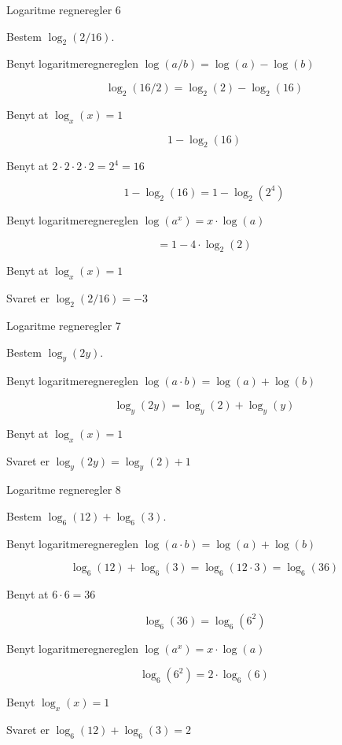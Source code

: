 \documentclass{article}
\begin{document}
\newpage
\begin{exercise}{Logaritme regneregler 6}

Bestem $\log_{2}(2/16) $.


\hint

Benyt logaritmeregnereglen $\log(a / b) = \log(a) - \log(b)$

\hint
\[
\log_{2}(16/2) = \log_{2}(2) - \log_{2}(16)
\]

\hint
Benyt at $\log_{x}(x) = 1$

\hint
\[
1 - \log_{2}(16)
\]

\hint
Benyt at $2 \cdot 2 \cdot 2 \cdot 2 = 2^4 = 16$

\hint
\[
1 - \log_{2}(16) = 1 - \log_{2}(2^4)
\]

\hint
Benyt logaritmeregnereglen $\log(a^x) = x \cdot \log(a)$

\hint
\[
= 1 - 4 \cdot \log_{2}(2)
\]

\hint
Benyt at $\log_{x}(x) = 1$

\hint

Svaret er $\log_{2}(2/16) = -3 $
\end{exercise}

\newpage
\begin{exercise}{Logaritme regneregler 7}

Bestem $\log_{y}(2y) $.


\hint

Benyt logaritmeregnereglen $\log(a \cdot b) = \log(a) + \log(b)$

\hint
\[
\log_{y}(2y) = \log_{y}(2) + \log_{y}(y)
\]

\hint
Benyt at $\log_{x}(x) = 1$

\hint

Svaret er $\log_{y}(2y) = \log_{y}(2) + 1 $
\end{exercise}

\newpage
\begin{exercise}{Logaritme regneregler 8}

Bestem $\log_{6}(12) + \log_{6}(3)$.


\hint

Benyt logaritmeregnereglen $\log(a \cdot b) = \log(a) + \log(b)$

\hint
\[
\log_{6}(12) + \log_{6}(3) = \log_{6}(12 \cdot 3) = \log_{6}(36)
\]

\hint
Benyt at $6 \cdot 6 = 36$

\hint
\[
\log_{6}(36) = \log_{6}(6^2)
\]

\hint
Benyt logaritmeregnereglen $\log(a^x) = x \cdot \log(a)$

\hint
\[
 \log_{6}(6^2) = 2 \cdot \log_{6}(6)
\]

\hint
Benyt $\log_{x}(x) = 1$

\hint

Svaret er $\log_{6}(12) + \log_{6}(3) = 2$
\end{exercise}
\end{document}
